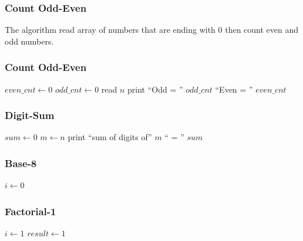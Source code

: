 \documentclass{../c-lecture}
\begin{document}
\begin{frame}
  \frametitle{Count Odd-Even}
  \begin{block}{}
    The algorithm read array of numbers that are ending with 0 then count even
    and odd numbers.
  \end{block}
\end{frame}

\begin{frame}
  \frametitle{Count Odd-Even}
  \begin{algorithm}[H]
  $even\_cnt \gets 0$\;
  $odd\_cnt \gets 0$\;
  read $n$\;
  print ``Odd = '' $odd\_cnt$ ``Even = '' $even\_cnt$\;
  \end{algorithm}
\end{frame}

\begin{frame}
  \frametitle{Digit-Sum}
  \begin{algorithm}[H]
  $sum \gets 0$\;
  $m \gets n$\;
  print ``sum of digits of'' $m$ `` = '' $sum$\;
  \end{algorithm}
\end{frame}

\begin{frame}
  \frametitle{Base-8}
  \begin{algorithm}[H]
  $i \gets 0$\;
  \end{algorithm}
\end{frame}

\begin{frame}
  \frametitle{Factorial-1}
  \begin{algorithm}[H]
  $i \gets 1$\;
  $result \gets 1$\;
  \end{algorithm}
\end{frame}
\end{document}

